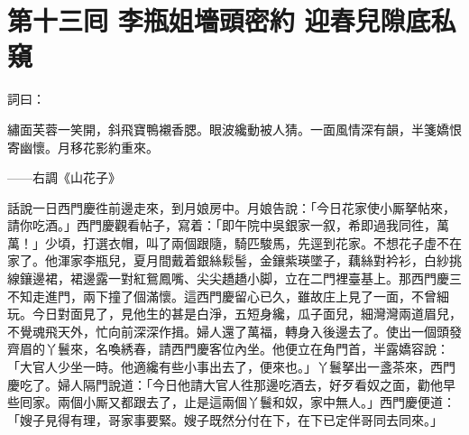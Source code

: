 
\chapter*{第十三囘 李瓶姐墻頭密約 迎春兒隙底私窺}


詞曰：

繡面芙蓉一笑開，斜飛寶鴨襯香腮。眼波纔動被人猜。一面風情深有韻，半箋嬌恨寄幽懷。月移花影約重來。

——右調《山花子》

話說一日西門慶徃前邊走來，到月娘房中。月娘告說：「今日花家使小厮拏帖來，請你吃酒。」西門慶觀看帖子，寫着：「即午院中吳銀家一叙，希即過我同徃，萬萬！」少頃，打選衣帽，叫了兩個跟隨，騎匹駿馬，先逕到花家。不想花子虛不在家了。他渾家李瓶兒，夏月間戴着銀絲鬏髻，金鑲紫瑛墜子，藕絲對衿衫，白紗挑線鑲邊裙，裙邊露一對紅鴛鳳嘴、尖尖趫趫小脚，立在二門裡臺基上。那西門慶三不知走進門，兩下撞了個滿懷。{}這西門慶留心已久，雖故庄上見了一面，不曾細玩。今日對面見了，見他生的甚是白淨，五短身纔，瓜子面兒，細灣灣兩道眉兒，不覺魂飛天外，忙向前深深作揖。婦人還了萬福，轉身入後邊去了。使出一個頭發齊眉的丫鬟來，名喚綉春，請西門慶客位內坐。他便立在角門首，半露嬌容說：「大官人少坐一時。他適纔有些小事出去了，便來也。」丫鬟拏出一盞茶來，西門慶吃了。婦人隔門說道：「今日他請大官人徃那邊吃酒去，好歹看奴之面，{}勸他早些囘家。兩個小厮又都跟去了，止是這兩個丫鬟和奴，家中無人。」{}西門慶便道：「嫂子見得有理，哥家事要緊。嫂子既然分付在下，在下已定伴哥同去同來。」

